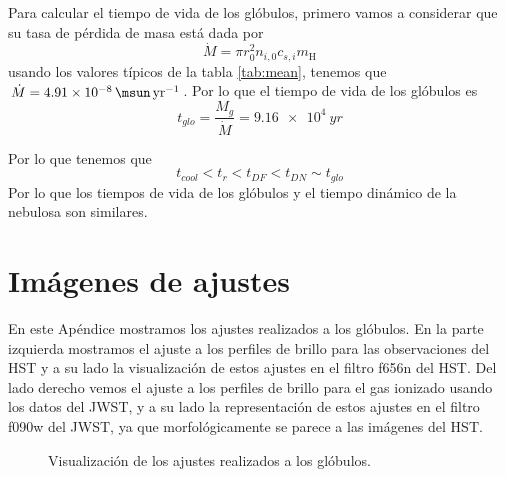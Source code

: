 \documentclass{book}
\begin{document}
Para calcular el tiempo de vida de los glóbulos, primero vamos a considerar que su tasa de pérdida de masa está dada por 
\begin{equation}
    \dot{M} =\pi r_0^2n_{i,0}c_{s,i}m_\mathrm{H}
\end{equation}
usando los valores típicos de la tabla \ref{tab:mean}, tenemos que $\dot{M} = \SI{4.91e-8}{\msun.yr^{-1}}$. Por lo que el tiempo de vida de los glóbulos es
\begin{equation}
    t_{glo}=\frac{M_g}{\dot{M}}=\SI{9.16e4}{yr}
\end{equation}

Por lo que tenemos que
\begin{equation}
    t_{cool} < t_r < t_{DF} < t_{DN} \sim t_{glo}
\end{equation}
Por lo que los tiempos de vida de los glóbulos y el tiempo dinámico de la nebulosa son similares. 

\chapter{Imágenes de ajustes}\label{App : ajustes}

En este Apéndice mostramos los ajustes realizados a los glóbulos. En la parte izquierda mostramos el ajuste a los perfiles de brillo para las observaciones del HST y a su lado la visualización de estos ajustes en el filtro f656n del HST. Del lado derecho vemos el ajuste a los perfiles de brillo para el gas ionizado usando los datos del JWST, y a su lado la representación de estos ajustes en el filtro f090w del JWST, ya que morfológicamente se parece a las imágenes del HST.

\begin{figure}[htb]
    \centering
    \caption{Visualización de los ajustes realizados a los glóbulos.}
    \label{fig:ajuestes_apendice}
\end{figure}
\end{document}

